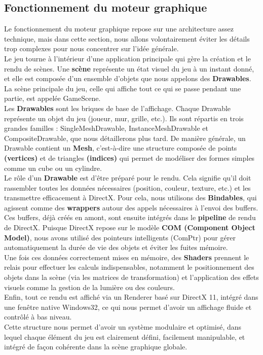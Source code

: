 \subsection{Fonctionnement du moteur graphique}
Le fonctionnement du moteur graphique repose sur une architecture assez technique, mais dans cette section, nous allons volontairement éviter les détails trop complexes pour nous concentrer sur l’idée générale. \\
Le jeu tourne à l’intérieur d’une application principale qui gère la création et le rendu de scènes. Une \textbf{scène} représente un état visuel du jeu à un instant donné, et elle est composée d’un ensemble d’objets que nous appelons des \textbf{Drawables}. La scène principale du jeu, celle qui affiche tout ce qui se passe pendant une partie, est appelée GameScene. \\
Les \textbf{Drawables} sont les briques de base de l’affichage. Chaque Drawable représente un objet du jeu (joueur, mur, grille, etc.). Ils sont répartis en trois grandes familles : SingleMeshDrawable, InstanceMeshDrawable et CompositeDrawable, que nous détaillerons plus tard. De manière générale, un Drawable contient un \textbf{Mesh}, c’est-à-dire une structure composée de points \textbf{(vertices)} et de triangles \textbf{(indices)} qui permet de modéliser des formes simples comme un cube ou un cylindre. \\
Le rôle d’un \textbf{Drawable} est d’être préparé pour le rendu. Cela signifie qu’il doit rassembler toutes les données nécessaires (position, couleur, texture, etc.) et les transmettre efficacement à DirectX. Pour cela, nous utilisons des \textbf{Bindables}, qui agissent comme des \textbf{wrappers} autour des appels nécessaires à l’envoi des buffers. Ces buffers, déjà créés en amont, sont ensuite intégrés dans le \textbf{pipeline} de rendu de DirectX. Puisque DirectX repose sur le modèle \textbf{COM (Component Object Model)}, nous avons utilisé des pointeurs intelligents (ComPtr) pour gérer automatiquement la durée de vie des objets et éviter les fuites mémoire. \\
Une fois ces données correctement mises en mémoire, des \textbf{Shaders} prennent le relais pour effectuer les calculs indispensables, notamment le positionnement des objets dans la scène (via les matrices de transformation) et l’application des effets visuels comme la gestion de la lumière ou des couleurs. \\
Enfin, tout ce rendu est affiché via un Renderer basé sur DirectX 11, intégré dans une fenêtre native Windows32, ce qui nous permet d’avoir un affichage fluide et contrôlé à bas niveau. \\
\newpage
Cette structure nous permet d’avoir un système modulaire et optimisé, dans lequel chaque élément du jeu est clairement défini, facilement manipulable, et intégré de façon cohérente dans la scène graphique globale. \\

